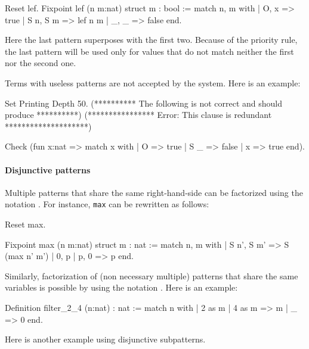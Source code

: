 \begin{coq_example}
Reset lef.
Fixpoint lef (n m:nat) {struct m} : bool :=
  match n, m with
  | O, x => true
  | S n, S m => lef n m
  | _, _ => false
  end.
\end{coq_example}

Here the last pattern superposes with the first two. Because
of the priority rule, the last pattern 
will be used only for values that do not match neither the  first nor
the second one.  

Terms with useless patterns are not accepted by the
system. Here is an example:
\begin{coq_eval}
Set Printing Depth 50.
  (********** The following is not correct and should produce **********)
  (**************** Error: This clause is redundant ********************)
\end{coq_eval}
\begin{coq_example}
Check (fun x:nat =>
         match x with
         | O => true
         | S _ => false
         | x => true
         end).
\end{coq_example}

\paragraph{Disjunctive patterns}

Multiple patterns that share the same right-hand-side can be
factorized using the notation \nelist{\multpattern}{\tt |}. For instance,
{\tt max} can be rewritten as follows:

\begin{coq_eval}
Reset max.
\end{coq_eval}
\begin{coq_example}
Fixpoint max (n m:nat) {struct m} : nat :=
  match n, m with
  | S n', S m' => S (max n' m')
  | 0, p | p, 0 => p
  end.
\end{coq_example}

Similarly, factorization of (non necessary multiple) patterns
that share the same variables is possible by using the notation
\nelist{\pattern}{\tt |}. Here is an example:

\begin{coq_example}
Definition filter_2_4 (n:nat) : nat :=
  match n with
  | 2 as m | 4 as m => m
  | _ => 0
  end.
\end{coq_example}

Here is another example using disjunctive subpatterns.

